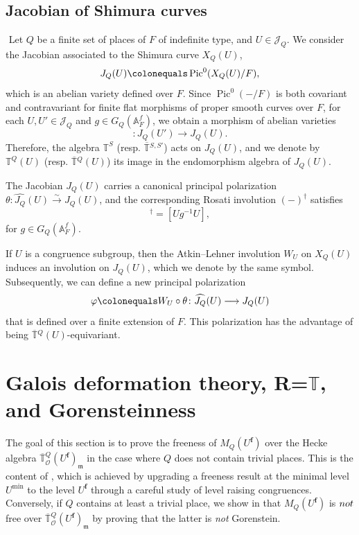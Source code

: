 \documentclass[a4paper, notitlepage, 10pt]{amsart}
\theoremstyle{plain} %
\theoremstyle{definition} %
\theoremstyle{remark} %
\numberwithin{equation}{section}
\newcommand{\bbT}{\mathbb T}
\newcommand{\Pic}{\operatorname{Pic}} %
\begin{document}
\subsection{Jacobian of Shimura curves}\label{jacshimuracurves}$ $
Let $Q$ be a finite set of places of $F$ of indefinite type, and $U\in \mathcal{J}_Q$. We consider the Jacobian associated to the Shimura curve $X_Q(U)$,
\begin{equation*}
J_Q(U)\colonequals\Pic^0(X_Q(U)/F),
\end{equation*}
which is an abelian variety defined over $F$. Since $\Pic^0(-/F)$ is both covariant and contravariant for finite flat morphisms of proper smooth curves over $F$, for each $U,U'\in \mathcal{J}_Q$ and $g\in G_Q(\mathbb{A}_F^f)$, we obtain a morphism of abelian varieties
\begin{equation*}
    [UgU']\colon J_Q(U') \longrightarrow J_Q(U).
\end{equation*}
Therefore, the algebra $\bbT^{S}$ (resp. $\overline{\bbT}{}^{S,S'}$) acts on $J_Q(U)$, and we denote by $\bbT^Q(U)$ (resp. $\overline{\bbT}{}^Q(U)$) its image in the endomorphism algebra of $J_Q(U)$.

The Jacobian $J_Q(U)$ carries a canonical principal polarization $\theta\colon \widehat{J_Q}(U) \xrightarrow{\sim} J_Q(U) $, and the corresponding Rosati involution $(-)^\dagger$ satisfies
\begin{equation*}
    [UgU]^\dagger=[Ug^{-1}U],
\end{equation*}
for $g\in G_Q(\mathbb{A}_F^f)$.

If $U$ is a congruence subgroup, then the Atkin--Lehner involution $W_U$ on $X_Q(U)$ induces an involution on $J_Q(U)$, which we denote by the same symbol. Subsequently, we can define a new principal polarization
$$\varphi\colonequals W_U\circ \theta \colon \widehat{J_Q}(U)\longrightarrow J_Q(U) $$
that is defined over a finite extension of $F$. This polarization has the advantage of being $\overline{\bbT}{}^Q(U)$-equivariant.


\section{Galois deformation theory, R=$\bbT$, and Gorensteinness}\label{galdef}
The goal of this section is to prove the freeness of $M_Q(U^{\mathbf{f}})$ over the Hecke algebra $\overline{\bbT}{}^{Q}_{\mathcal{O}}(U^{\mathbf{f}})_{\mathfrak{m}}$ in the case where $Q$ does not contain trivial places. This is the content of , which is achieved by upgrading a freeness result at the minimal level $U^{\min}$ to the level $U^{\mathbf{f}}$ through a careful study of level raising congruences. Conversely, if $Q$ contains at least a trivial place, we show in  that $M_Q(U^{\mathbf{f}})$ is $\emph{not}$ free over $\overline{\bbT}{}^{Q}_{\mathcal{O}}(U^{\mathbf{f}})_{\mathfrak{m}}$ by proving that the latter is \emph{not} Gorenstein. 
\end{document}
